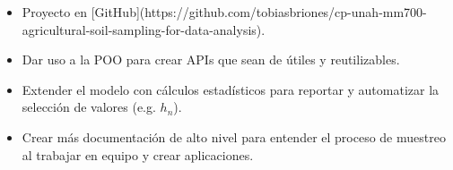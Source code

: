 \documentclass{article}
\begin{document}
\begin{itemize}
    \item Proyecto en [GitHub](https://github.com/tobiasbriones/cp-unah-mm700-agricultural-soil-sampling-for-data-analysis).
    
    \item Dar uso a la POO para crear APIs que sean de útiles y reutilizables.
    
    \item Extender el modelo con cálculos estadísticos para reportar y automatizar la selección de valores (e.g. $h_n$).
    
    \item Crear más documentación de alto nivel para entender el proceso de muestreo al trabajar en equipo y crear aplicaciones.
\end{itemize}

\printbibliography
\end{document}
